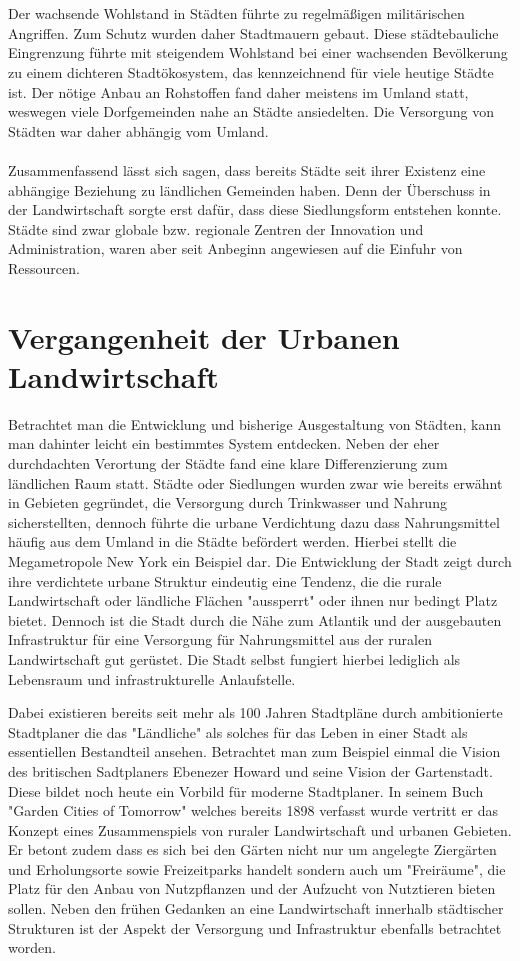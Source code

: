 \documentclass{scrartcl}
\begin{document}
\\
\\
Der wachsende Wohlstand in Städten führte zu regelmäßigen militärischen Angriffen. Zum Schutz wurden daher Stadtmauern gebaut. Diese städtebauliche Eingrenzung führte mit steigendem Wohlstand bei einer wachsenden Bevölkerung zu einem dichteren Stadtökosystem, das kennzeichnend für viele heutige Städte ist. Der nötige Anbau an Rohstoffen fand daher meistens im Umland statt, weswegen viele Dorfgemeinden nahe an Städte ansiedelten. Die Versorgung von Städten war daher abhängig vom Umland. 
\\
\\
Zusammenfassend lässt sich sagen, dass bereits Städte seit ihrer Existenz eine abhängige Beziehung zu ländlichen Gemeinden haben. Denn der Überschuss in der Landwirtschaft sorgte erst dafür, dass diese Siedlungsform entstehen konnte. Städte sind zwar globale bzw. regionale Zentren der Innovation und Administration, waren aber seit Anbeginn angewiesen auf die Einfuhr von Ressourcen. 


\section{Vergangenheit der Urbanen Landwirtschaft}

Betrachtet man die Entwicklung und bisherige Ausgestaltung von Städten, kann man dahinter leicht ein bestimmtes System entdecken. Neben der eher durchdachten Verortung der Städte fand eine klare Differenzierung zum ländlichen Raum statt. Städte oder Siedlungen wurden
zwar wie bereits erwähnt in Gebieten gegründet, die Versorgung durch Trinkwasser und Nahrung sicherstellten, dennoch führte die urbane Verdichtung dazu dass Nahrungsmittel häufig aus dem Umland in die Städte befördert werden. Hierbei stellt die Megametropole New York ein Beispiel dar. Die Entwicklung der Stadt zeigt durch ihre verdichtete urbane Struktur eindeutig eine Tendenz, die die rurale Landwirtschaft oder ländliche Flächen "aussperrt" oder ihnen nur bedingt Platz bietet. Dennoch ist die Stadt durch die Nähe zum Atlantik und der ausgebauten Infrastruktur für eine Versorgung für Nahrungsmittel aus der ruralen Landwirtschaft gut gerüstet. Die Stadt selbst fungiert hierbei lediglich als Lebensraum und infrastrukturelle Anlaufstelle.

Dabei existieren bereits seit mehr als 100 Jahren Stadtpläne durch ambitionierte Stadtplaner die das "Ländliche" als solches für das Leben in einer
Stadt als essentiellen Bestandteil ansehen. Betrachtet man zum Beispiel einmal die Vision des britischen Sadtplaners Ebenezer Howard und seine Vision der Gartenstadt. Diese bildet noch heute ein Vorbild für moderne Stadtplaner. In seinem Buch "Garden Cities of Tomorrow" welches bereits 1898 verfasst wurde vertritt er das Konzept eines Zusammenspiels von ruraler Landwirtschaft und urbanen Gebieten. Er betont zudem dass es sich bei den
Gärten nicht nur um angelegte Ziergärten und Erholungsorte sowie Freizeitparks handelt sondern auch um "Freiräume", die Platz für den Anbau von
Nutzpflanzen und der Aufzucht von Nutztieren bieten sollen. Neben den frühen Gedanken an eine Landwirtschaft innerhalb städtischer Strukturen ist der Aspekt der Versorgung und Infrastruktur ebenfalls betrachtet worden.
\end{document}
